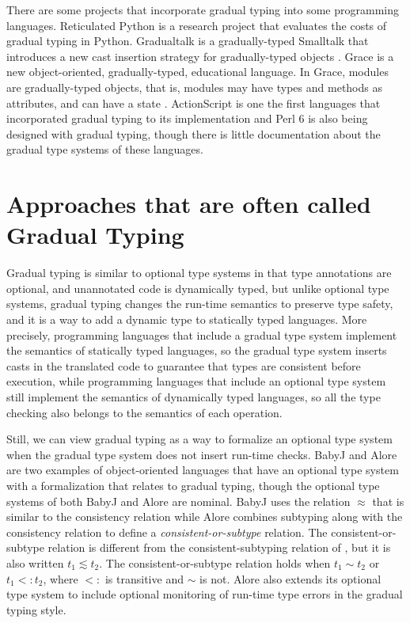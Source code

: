 There are some projects that incorporate gradual typing into some
programming languages.
Reticulated Python \citep{reticulated,vitousek2014deg} is a research
project that evaluates the costs of gradual typing in Python.
Gradualtalk \citep{allende2013gts} is a gradually-typed Smalltalk
that introduces a new cast insertion strategy for gradually-typed
objects \citep{allende2013cis}.
Grace \citep{black2012grace,black2013sg} is a new object-oriented,
gradually-typed, educational language.
In Grace, modules are gradually-typed objects, that is, modules
may have types and methods as attributes, and can have a state
\citep{homer2013modules}.
ActionScript \citep{moock2007as3} is one the first languages that
incorporated gradual typing to its implementation and
Perl 6 \citep{tang2007pri} is also being designed with gradual typing,
though there is little documentation about the gradual type systems
of these languages.

\section{Approaches that are often called Gradual Typing}
\label{sec:approaches}

Gradual typing is similar to optional type systems in that type
annotations are optional, and unannotated code is dynamically
typed, but unlike optional type systems, gradual typing changes
the run-time semantics to preserve type safety, and it is a way to
add a dynamic type to statically typed languages.
More precisely, programming languages that include a gradual type
system implement the semantics of statically typed languages, so
the gradual type system inserts casts in the translated code to
guarantee that types are consistent before execution, while
programming languages that include an optional type system still
implement the semantics of dynamically typed languages, so all
the type checking also belongs to the semantics of each operation.

Still, we can view gradual typing as a way to formalize an optional
type system when the gradual type system does not insert run-time
checks.
BabyJ \citep{anderson2003babyj} and Alore \citep{lehtosalo2011alore}
are two examples of object-oriented languages that have an
optional type system with a formalization that relates to gradual typing,
though the optional type systems of both BabyJ and Alore are nominal.
BabyJ uses the relation $\approx$ that is similar to the consistency
relation while Alore combines subtyping along with the consistency
relation to define a \emph{consistent-or-subtype} relation.
The consistent-or-subtype relation is different from the
consistent-subtyping relation of \citet{siek2007objects}, but it is
also written $t_{1} \lesssim t_{2}$.
The consistent-or-subtype relation holds when $t_{1} \sim t_{2}$
or $t_{1} <: t_{2}$, where $<:$ is transitive and $\sim$ is not.
Alore also extends its optional type system to include optional
monitoring of run-time type errors in the gradual typing style.

